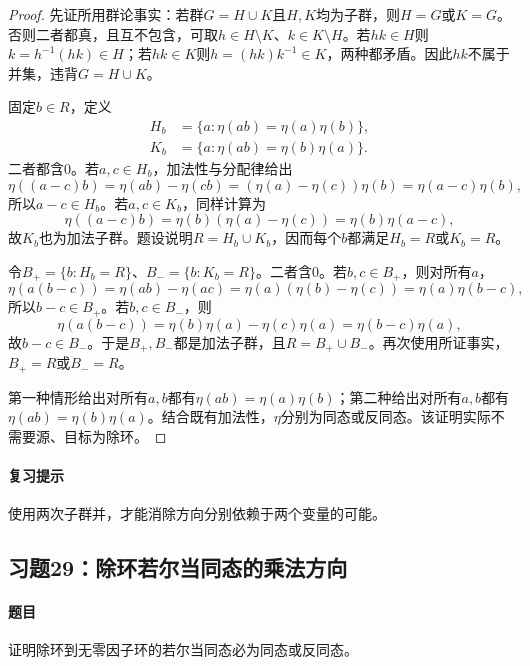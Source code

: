 \begin{proof}

先证所用群论事实：若群$G=H\cup K$且$H,K$均为子群，则$H=G$或$K=G$。否则二者都真，且互不包含，可取$h\in H\setminus K$、$k\in K\setminus H$。若$hk\in H$则$k=h^{-1}(hk)\in H$；若$hk\in K$则$h=(hk)k^{-1}\in K$，两种都矛盾。因此$hk$不属于并集，违背$G=H\cup K$。

固定$b\in R$，定义
\begin{align*}
H_b&=\{a:\eta(ab)=\eta(a)\eta(b)\},\\
K_b&=\{a:\eta(ab)=\eta(b)\eta(a)\}.
\end{align*}
二者都含$0$。若$a,c\in H_b$，加法性与分配律给出
\[
\eta((a-c)b)=\eta(ab)-\eta(cb)
=(\eta(a)-\eta(c))\eta(b)=\eta(a-c)\eta(b),
\]
所以$a-c\in H_b$。若$a,c\in K_b$，同样计算为
\[
\eta((a-c)b)=\eta(b)(\eta(a)-\eta(c))=\eta(b)\eta(a-c),
\]
故$K_b$也为加法子群。题设说明$R=H_b\cup K_b$，因而每个$b$都满足$H_b=R$或$K_b=R$。

令$B_+=\{b:H_b=R\}$、$B_-=\{b:K_b=R\}$。二者含$0$。若$b,c\in B_+$，则对所有$a$，
\[
\eta(a(b-c))=\eta(ab)-\eta(ac)=\eta(a)(\eta(b)-\eta(c))=\eta(a)\eta(b-c),
\]
所以$b-c\in B_+$。若$b,c\in B_-$，则
\[
\eta(a(b-c))=\eta(b)\eta(a)-\eta(c)\eta(a)=\eta(b-c)\eta(a),
\]
故$b-c\in B_-$。于是$B_+,B_-$都是加法子群，且$R=B_+\cup B_-$。再次使用所证事实，$B_+=R$或$B_-=R$。

第一种情形给出对所有$a,b$都有$\eta(ab)=\eta(a)\eta(b)$；第二种给出对所有$a,b$都有$\eta(ab)=\eta(b)\eta(a)$。结合既有加法性，$\eta$分别为同态或反同态。该证明实际不需要源、目标为除环。

\end{proof}

\paragraph{复习提示}

使用两次子群并，才能消除方向分别依赖于两个变量的可能。



\subsection{习题29：除环若尔当同态的乘法方向}

\label{ex:3:29}

\paragraph{题目}

证明除环到无零因子环的若尔当同态必为同态或反同态。

